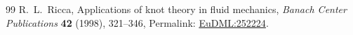 \documentclass[11pt]{article}
\theoremstyle{definition}
\theoremstyle{plain}
\theoremstyle{remark}
\begin{document}
\begin{thebibliography}{99}
            R.~L.~Ricca,
            \newblock Applications of knot theory in fluid mechanics,
            \newblock \emph{Banach Center Publications} \textbf{42} (1998), 321--346,
            \newblock Permalink: \href{https://eudml.org/doc/252224}{EuDML:252224}.

        \end{thebibliography}
\end{document}
